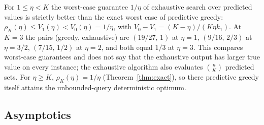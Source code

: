 \begin{remark}
\label{rem:exhaustive-vs-greedy}
For $1\le\eta<K$ the worst-case guarantee $1/\eta$ of exhaustive search
over predicted values is strictly better than the exact worst case of
predictive greedy: $\rho_K(\eta)\le V_1(\eta)<V_0(\eta)=1/\eta$, with
$V_0-V_1=(K-\eta)/(K\eta k_1)$.  At $K=3$ the pairs
(greedy, exhaustive) are $(19/27,\,1)$ at $\eta=1$,
$(9/16,\,2/3)$ at $\eta=3/2$, $(7/15,\,1/2)$ at $\eta=2$, and both equal
$1/3$ at $\eta=3$.  This compares worst-case guarantees and does not say
that the exhaustive output has larger true value on every instance; the
exhaustive algorithm also evaluates $\binom nK$ predicted sets.  For
$\eta\ge K$, $\rho_K(\eta)=1/\eta$ (Theorem~\ref{thm:exact}), so there
predictive greedy itself attains the unbounded-query deterministic optimum.
\end{remark}

\subsection{Asymptotics}\label{sec:asymptotics}

